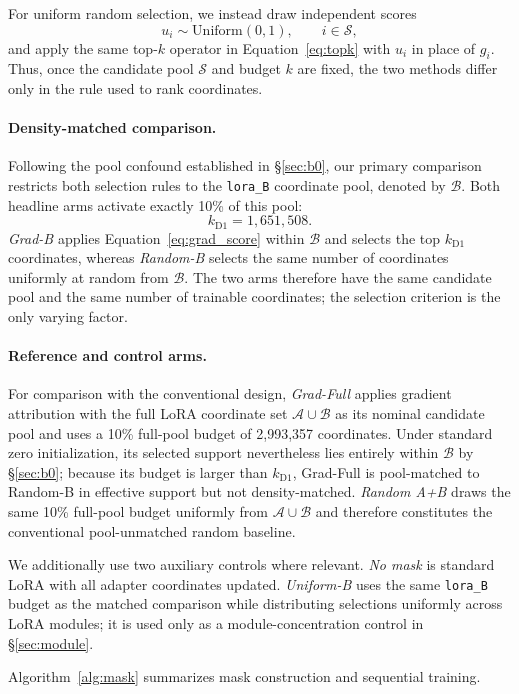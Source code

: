 For uniform random selection, we instead draw independent scores
\begin{equation}
\label{eq:random_score}
u_i \sim \mathrm{Uniform}(0,1),
\qquad i \in \mathcal{S},
\end{equation}
and apply the same top-$k$ operator in Equation~\ref{eq:topk} with
$u_i$ in place of $g_i$. Thus, once the candidate pool
$\mathcal{S}$ and budget $k$ are fixed, the two methods differ only in
the rule used to rank coordinates.

\paragraph{Density-matched comparison.}
Following the pool confound established in \S\ref{sec:b0}, our primary
comparison restricts both selection rules to the
\texttt{lora\_B} coordinate pool, denoted by $\mathcal{B}$.
Both headline arms activate exactly 10\% of this pool:
\begin{equation}
\label{eq:d1_budget}
k_{\mathrm{D1}}
=
1{,}651{,}508.
\end{equation}
\emph{Grad-B} applies Equation~\ref{eq:grad_score} within
$\mathcal{B}$ and selects the top $k_{\mathrm{D1}}$ coordinates,
whereas \emph{Random-B} selects the same number of coordinates
uniformly at random from $\mathcal{B}$. The two arms therefore have
the same candidate pool and the same number of trainable coordinates;
the selection criterion is the only varying factor.

\paragraph{Reference and control arms.}
For comparison with the conventional design, \emph{Grad-Full} applies
gradient attribution with the full LoRA coordinate set
$\mathcal{A}\cup\mathcal{B}$ as its nominal candidate pool and uses a
10\% full-pool budget of 2,993,357 coordinates. Under standard
zero initialization, its selected support nevertheless lies entirely
within $\mathcal{B}$ by \S\ref{sec:b0}; because its budget is larger
than $k_{\mathrm{D1}}$, Grad-Full is pool-matched to Random-B in
effective support but not density-matched. \emph{Random A+B} draws the
same 10\% full-pool budget uniformly from
$\mathcal{A}\cup\mathcal{B}$ and therefore constitutes the conventional
pool-unmatched random baseline.

We additionally use two auxiliary controls where relevant.
\emph{No mask} is standard LoRA with all adapter coordinates updated.
\emph{Uniform-B} uses the same \texttt{lora\_B} budget as the matched
comparison while distributing selections uniformly across LoRA modules;
it is used only as a module-concentration control in
\S\ref{sec:module}.

Algorithm~\ref{alg:mask} summarizes mask construction and sequential
training.